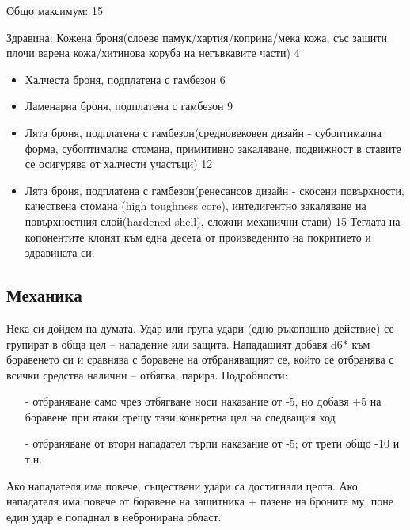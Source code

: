Общо максимум: 15

Здравина:
Кожена броня(слоеве памук/хартия/коприна/мека кожа, със зашити плочи варена кожа/хитинова коруба на негъвкавите части) 4
\begin{itemize}
\item{Халчеста броня, подплатена с гамбезон 6}
\item{Ламенарна броня, подплатена с гамбезон 9}
\item{Лята броня, подплатена с гамбезон(средновековен дизайн - субоптимална форма, субоптимална стомана, примитивно закаляване, подвижност в ставите се осигурява от халчести участъци) 12}
\item{Лята броня, подплатена с гамбезон(ренесансов дизайн - скосени повърхности, качествена стомана (high toughness core),  интелигентно закаляване на повърхностния слой(hardened shell), сложни механични стави) 15}
Теглата на копонентите клонят към една десета от произведенито на покритието и здравината си.
\end{itemize}

\subsection{Механика}
Нека си дойдем на думата.
Удар или група удари (едно ръкопашно действие) се групират в обща цел – нападение или защита.
Нападащият добавя d6* към боравенето си и сравнява с боравене на отбраняващият се, който се отбранява с всички средства налични – отбягва, парира.
Подробности:
\begin{itemize}
\item[-]{отбраняване само чрез отбягване носи наказание от -5, но добавя +5 на боравене при атаки срещу тази конкретна цел на следващия ход}
\item[-]{отбраняване от втори нападател търпи наказание от -5; от трети общо -10 и т.н.}
\end{itemize}

Ако нападателя има повече, съществени удари са достигнали целта.
Ако нападателя има повече от боравене на защитника + пазене на броните му, поне един удар е попаднал в небронирана област.

